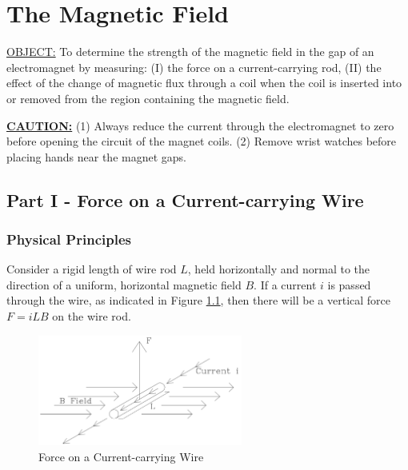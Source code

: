 \chapter{The Magnetic Field}
   \underline{OBJECT:} To determine the strength of the magnetic field in the gap of an electromagnet by measuring: (I) the force on a current-carrying rod, (II) the effect of the change of magnetic flux through a coil when the coil is inserted into or removed from the region containing the magnetic field.\myskip

\underline{\textbf{CAUTION:}} 
(1) Always reduce the current through the electromagnet to zero before opening the circuit of the magnet coils. 
(2) Remove wrist watches before placing hands near the magnet gaps.


\section{Part I - Force on a Current-carrying Wire}
\subsection{Physical Principles}
Consider a rigid length of wire rod $L$, held horizontally and normal to the direction of a uniform, horizontal magnetic field $B$. If a current $i$ is passed through the wire, as indicated in Figure {\ref{fig:force}}, then there will be a vertical force $F=iLB$ on the wire rod.
\begin{figure}[h]
\centering
\includegraphics[width=0.6\textwidth]{./Exp5/pic/image1.png}
\caption{Force on a Current-carrying Wire}
\label{fig:force}
\end{figure} 

